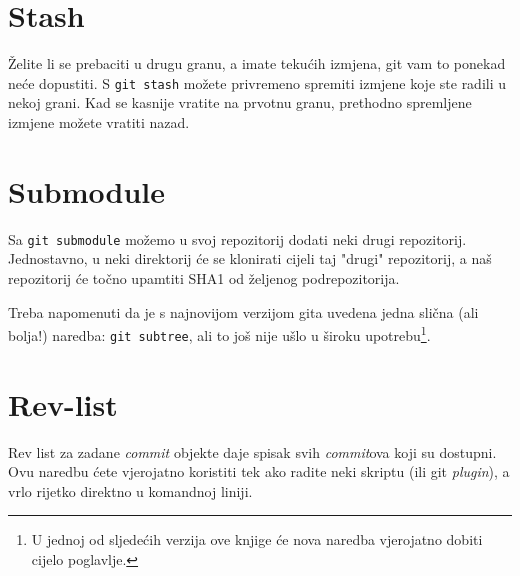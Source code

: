 \section*{Stash}

Želite li se prebaciti u drugu granu, a imate tekućih izmjena, git vam to ponekad neće dopustiti.
S \verb+git stash+ možete privremeno spremiti izmjene koje ste radili u nekoj grani.
Kad se kasnije vratite na prvotnu granu, prethodno spremljene izmjene možete vratiti nazad.

\section*{Submodule}

Sa \verb+git submodule+ možemo u svoj repozitorij dodati neki drugi repozitorij. 
Jednostavno, u neki direktorij će se klonirati cijeli taj "drugi" repozitorij, a naš repozitorij će točno upamtiti SHA1 od željenog podrepozitorija.

Treba napomenuti da je s najnovijom verzijom gita uvedena jedna slična (ali bolja!) naredba: \verb+git subtree+, ali to još nije ušlo u široku upotrebu\footnote{U jednoj od sljedećih verzija ove knjige će nova naredba vjerojatno dobiti cijelo poglavlje.}.

\section*{Rev-list}

Rev list za zadane \emph{commit} objekte daje spisak svih \emph{commit}ova koji su dostupni.
Ovu naredbu ćete vjerojatno koristiti tek ako radite neki skriptu (ili git \emph{plugin}), a vrlo rijetko direktno u komandnoj liniji.

